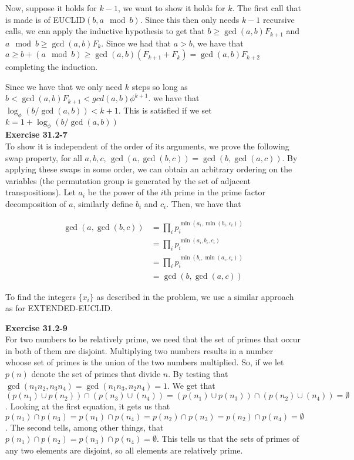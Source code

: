 \documentclass{article}
\begin{document}
Now, suppose it holds for $k-1$, we want to show it holds for $k$. The first call that is made is of EUCLID$(b,a\mod b)$. Since this then only needs $k-1$ recursive calls, we can apply the inductive hypothesis to get that $b \ge \gcd(a,b) F_{k+1}$ and $a\mod b \ge \gcd(a,b) F_{k}$. Since we had that $a > b$, we have that $a \ge b + (a\mod b) \ge \gcd(a,b) ( F_{k+1} + F_{k}) = \gcd(a,b) F_{k+2}$ completing the induction.

Since we have that we only need $k$ steps so long as $b <\gcd(a,b) F_{k+1} < gcd(a,b) \phi^{k+1}$. we have that $\log_\phi (b/\gcd(a,b)) < k+1$. This is satisfied if we set $k=1 + \log_\phi(b/\gcd(a,b))$\\



\noindent\textbf{Exercise 31.2-7}\\

To show it is independent of the order of its arguments, we prove the following swap property, for all $a,b,c$, $\gcd(a,\gcd(b,c)) = \gcd(b,\gcd(a,c))$. By applying these swaps in some order, we can obtain an arbitrary ordering on the variables (the permutation group is generated by the set of adjacent transpositions). Let $a_i$ be the power of the $i$th prime in the prime factor decomposition of $a$, similarly define $b_i$ and $c_i$. Then, we have that 

\begin{align*}
\gcd(a,\gcd(b,c)) &= \prod_{i}p_i^{\min(a_i,\min(b_i,c_i))}\\
& = \prod_{i}p_i^{\min(a_i,b_i,c_i)} \\
&= \prod_{i}p_i^{\min(b_i,\min(a_i,c_i))} \\
&= \gcd(b,\gcd(a,c)) 
\end{align*}

To find the integers $\{x_i\}$ as described in the problem, we use a similar approach as for EXTENDED-EUCLID. 


\noindent\textbf{Exercise 31.2-9}\\
For two numbers to be relatively prime, we need that the set of primes that occur in both of them are disjoint. Multiplying two numbers results in a number whoose set of primes is the union of the two numbers multiplied. So, if we let $p(n)$ denote the set of primes that divide $n$. By testing that $ \gcd(n_1n_2,n_3n_4) = \gcd(n_1n_3, n_2n_4) = 1$. We get that $(p(n_1)\cup p(n_2))\cap(p(n_3)\cup(n_4)) = (p(n_1)\cup p(n_3))\cap(p(n_2)\cup(n_4)) = \emptyset$. Looking at the first equation, it gets us that $p(n_1) \cap p(n_3) = p(n_1) \cap p(n_4)  = p(n_2) \cap p(n_3) = p(n_2) \cap p(n_4) = \emptyset$. The second tells, among other things, that $p(n_1) \cap p(n_2) = p(n_3) \cap p(n_4) = \emptyset$. This tells us that the sets of primes of any two elements are disjoint, so all elements are relatively prime.
\end{document}
